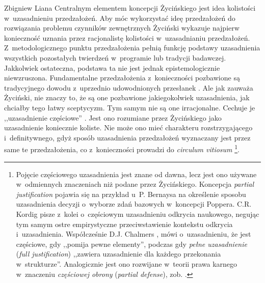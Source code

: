 \begin{artplenv}{Zbigniew Liana}
Centralnym elementem koncepcji Życińskiego jest idea kolistości w~uzasadnieniu przedzałożeń. Aby móc wykorzystać ideę przedzałożeń do rozwiązania problemu czynników zewnętrznych Życiński wykazuje najpierw konieczność uznania przez racjonalistę kolistości w~uzasadnianiu przedzałożeń. Z~metodologicznego punktu przedzałożenia pełnią funkcję podstawy uzasadnienia wszystkich pozostałych twierdzeń w~programie lub tradycji badawczej. Jakkolwiek ostateczna, podstawa ta nie jest jednak epistemologicznie niewzruszona. Fundamentalne przedzałożenia z~konieczności pozbawione są tradycyjnego dowodu z~uprzednio udowodnionych przesłanek
\parencite[][przypis 1]{zycinski_teizm_1985}. %
 Ale jak zauważa Życiński, nie znaczy to, że są one pozbawione jakiegokolwiek uzasadnienia, jak chciałby tego łatwy sceptycyzm. Tym samym nie są one irracjonalne. Cechuje je ,,uzasadnienie częściowe'' 
\parencite[][s.~7.156.161.169]{zycinski_teizm_1985}. %
 Jest ono rozumiane przez Życińskiego jako uzasadnienie koniecznie koliste. Nie może ono mieć charakteru rozstrzygającego i~definitywnego, gdyż sposób uzasadnienia przedzałożeń wyznaczany jest przez same te przedzałożenia, co z~konieczności prowadzi do \textit{circulum vitiosum} 
\parencite[][s.~173 oraz 129.141.164]{zycinski_teizm_1985}%
\footnote{Pojęcie częściowego uzasadnienia jest znane od dawna, lecz jest ono używane w~odmiennych znaczeniach niż podane przez Życińskiego. Koncepcja \textit{partial justification} pojawia się na przykład u~P. Bernaysa 
\parencite*[][s.~38]{bernays_reflections_1964} %
 na określenie sposobu uzasadnienia decyzji o~wyborze zdań bazowych w~koncepcji Poppera. C.R. Kordig 
\parencite[][s.~112]{kordig_discovery_1978} %
 pisze z~kolei o~częściowym uzasadnieniu odkrycia naukowego, negując tym samym ostre empirystyczne przeciwstawienie kontekstu odkrycia i~uzasadnienia. Współcześnie D.J. Chalmers 
\parencite[][s.~96]{chalmers_constructing_2012}, %
 mówi o~uzasadnieniu, że jest częściowe, gdy ,,pomija pewne elementy'', podczas gdy \textit{pełne uzasadnienie} (\textit{full justification}) ,,zawiera uzasadnienie dla każdego przekonania w~strukturze''. Analogicznie jest ono rozwijane w~teorii prawa karnego w~znaczeniu \textit{częściowej obrony} (\textit{partial defense}), zob. 
\parencite[][]{eldar_misguided_2014}.%
}.


\end{artplenv}
